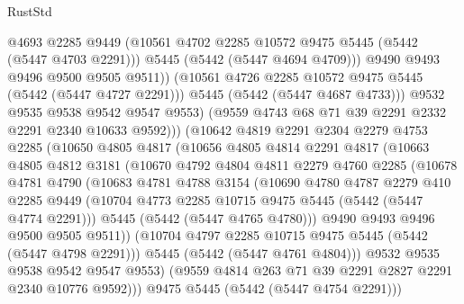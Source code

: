 \begin{lexlean}{RustStd}
\begin{coremodule}
{\begin{coremodule}
{{{{{{{{{{{{                        @4693
                        @2285
                        @9449
                        (@10561 @4702 @2285 @10572 @9475 @5445 (@5442 (@5447 @4703 @2291)))
                        @5445
                        (@5442 (@5447 @4694 @4709)))
                      @9490
                      @9493
                      @9496
                      @9500
                      @9505
                      @9511))
                  (@10561 @4726 @2285 @10572 @9475 @5445 (@5442 (@5447 @4727 @2291)))
                  @5445
                  (@5442 (@5447 @4687 @4733)))
                @9532
                @9535
                @9538
                @9542
                @9547
                @9553)
              (@9559 @4743 @68 @71 @39 @2291 @2332 @2291 @2340 @10633 @9592)))
          (@10642
            @4819
            @2291
            @2304
            @2279
            @4753
            @2285
            (@10650
              @4805
              @4817
              (@10656
                @4805
                @4814
                @2291
                @4817
                (@10663
                  @4805
                  @4812
                  @3181
                  (@10670
                    @4792
                    @4804
                    @4811
                    @2279
                    @4760
                    @2285
                    (@10678
                      @4781
                      @4790
                      (@10683
                        @4781
                        @4788
                        @3154
                        (@10690
                          @4780
                          @4787
                          @2279
                          @410
                          @2285
                          @9449
                          (@10704 @4773 @2285 @10715 @9475 @5445 (@5442 (@5447 @4774 @2291)))
                          @5445
                          (@5442 (@5447 @4765 @4780)))
                        @9490
                        @9493
                        @9496
                        @9500
                        @9505
                        @9511))
                    (@10704 @4797 @2285 @10715 @9475 @5445 (@5442 (@5447 @4798 @2291)))
                    @5445
                    (@5442 (@5447 @4761 @4804)))
                  @9532
                  @9535
                  @9538
                  @9542
                  @9547
                  @9553)
                (@9559 @4814 @263 @71 @39 @2291 @2827 @2291 @2340 @10776 @9592)))
            @9475
            @5445
            (@5442 (@5447 @4754 @2291)))
}}}}}}}}}}}}
\end{coremodule}}
\end{coremodule}
\end{lexlean}
